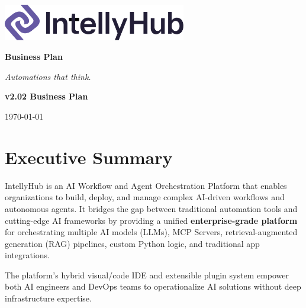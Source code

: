\documentclass[11pt, a4paper, oneside]{article}
\begin{document}
\thispagestyle{empty} 
\begin{titlepage}
    \centering
    \vspace{1cm}
    
    \includegraphics[width=0.6\textwidth]{IntellyHub_Logo_Colored.png}
    
    \vspace{2.5cm}
    
    {\Huge\bfseries\color{PrimaryColor}Business Plan}
    
    \vspace{1.5cm}
    
    {\Large\itshape\lightfont Automations that think.}
    
    \vfill %
    
    {\large\bfseries\color{PrimaryColor}v2.02 \color{SecondaryColor}Business Plan}
    
    \vspace{0.5cm}
    
    {\large \today}
    
\end{titlepage}

\tableofcontents
\newpage


\section{Executive Summary}
IntellyHub is an AI Workflow and Agent Orchestration Platform that enables organizations to build, deploy, and manage complex AI-driven workflows and autonomous agents. It bridges the gap between traditional automation tools and cutting-edge AI frameworks by providing a unified \textbf{enterprise-grade platform} for orchestrating multiple AI models (LLMs), MCP Servers, retrieval-aug\-ment\-ed generation (RAG) pipelines, custom Python logic, and traditional app integrations. 

The platform's hybrid visual/code IDE and extensible plugin system empower both AI engineers and DevOps teams to operationalize AI solutions without deep infrastructure expertise. 
\end{document}

